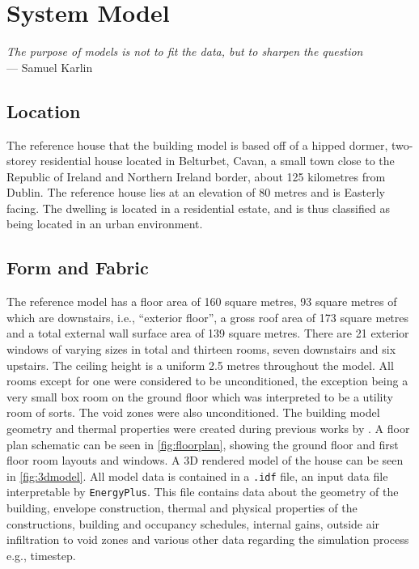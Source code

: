 \chapter{System Model}\label{ch:model} 

\begin{flushright}{\slshape
    The purpose of models is not to fit the data, but to sharpen the question} \\ \medskip
    --- Samuel Karlin
\end{flushright}

\section{Location}
The reference house that the building model is based off of a hipped dormer, two-storey residential house located in Belturbet, Cavan, a small town close to the Republic of Ireland and Northern Ireland border, about 125 kilometres from Dublin. The reference house lies at an elevation of 80 metres and is Easterly facing. The dwelling is located in a residential estate, and is thus classified as being located in an urban environment.

\section{Form and Fabric}
The reference model has a floor area of 160 square metres, 93 square metres of which are downstairs, i.e., ``exterior floor'', a gross roof area of 173 square metres and a total external wall surface area of 139 square metres. There are 21 exterior windows of varying sizes in total and thirteen rooms, seven downstairs and six upstairs. The ceiling height is a uniform 2.5 metres throughout the model. All rooms except for one were considered to be unconditioned, the exception being a very small box room on the ground floor which was interpreted to be a utility room of sorts. The void zones were also unconditioned. The building model geometry and thermal properties were created during previous works by \citeauthor{keogh_technical_2022}. A floor plan schematic can be seen in \cref{fig:floorplan}, showing the ground floor and first floor room layouts and windows. A 3D rendered model of the house can be seen in \cref{fig:3dmodel}. All model data is contained in a \texttt{.idf} file, an input data file interpretable by \texttt{EnergyPlus}. This file contains data about the geometry of the building, envelope construction, thermal and physical properties of the constructions, building and occupancy schedules, internal gains, outside air infiltration to void zones and various other data regarding the simulation process e.g., timestep. 

